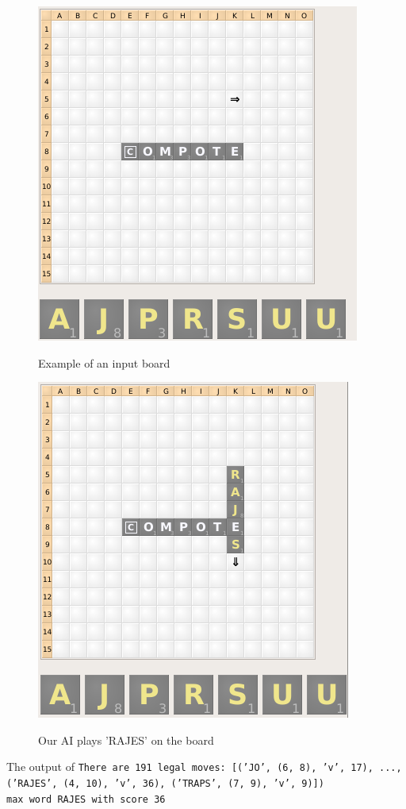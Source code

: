 \documentclass[12pt]{article}
\begin{document}
\begin{figure}[h]
    \centering
  \includegraphics[scale=0.5]{exampleboard}
  \caption{Example of an input board}
  \endminipage
      \centering
  \includegraphics[scale=0.5]{exampleplay}\\
   \caption{Our AI plays 'RAJES' on the board}
  \endminipage{}
\end{figure}

The output of
\texttt{There are 191 legal moves: [('JO', (6, 8), 'v', 17), ...,  ('RAJES', (4, 10), 'v', 36), ('TRAPS', (7, 9), 'v', 9)])\\
max word RAJES with score 36}
\end{document}
